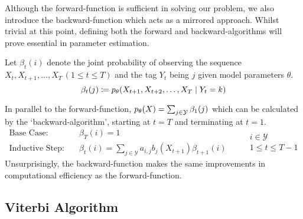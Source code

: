 \documentclass[../main.tex]{subfiles}
\begin{document}
Although the forward-function is sufficient in solving our problem, we also introduce the backward-function which acts as a mirrored approach.
Whilst trivial at this point, defining both the forward and backward-algorithms will prove essential in parameter estimation.
\begin{definition} \label{def:backward-func}
    Let $\beta_t(i)$ denote the joint probability of observing the sequence $X_t,X_{t+1},\ldots,X_T \, (1 \leq t \leq T)$ and the tag $Y_t$ being $j$ given model parameters $\theta$.
    \begin{equation*}
        \beta_t(j) \coloneqq p_\theta(X_{t+1},X_{t+2},\ldots,X_T \mid Y_t=k)
    \end{equation*}
\end{definition}
In parallel to the forward-function, $p_\theta(X) = \sum_{j \in \mathcal{Y}} \beta_1(j)$ which can be calculated by the `backward-algorithm', starting at $t=T$ and terminating at $t=1$.
\begin{equation*}
    \begin{aligned}
        \text{Base Case:} & \quad \beta_T(i) = 1 \\
        \text{Inductive Step:} & \quad \beta_{t}(i) = \sum_{j \in \mathcal{Y}} a_{i,j} b_j(X_{t+1}) \beta_{t+1}(i)
    \end{aligned} \qquad 
        \begin{array}{lr}
            i \in \mathcal{Y} \\
            1 \leq t \leq T-1
        \end{array}
\end{equation*}
Unsurprisingly, the backward-function makes the same improvements in computational efficiency as the forward-function.

\subsection{Viterbi Algorithm}
\end{document}

